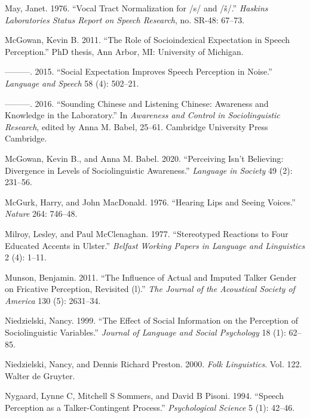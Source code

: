 \documentclass[
  letterpaper,
  DIV=11,
  numbers=noendperiod]{scrartcl}
\newlength{\cslhangindent}
\newenvironment{CSLReferences}[2] %
 {\begin{list}{}{%
  \setlength{\itemindent}{0pt}
  \setlength{\leftmargin}{0pt}
  \setlength{\parsep}{0pt}
  \ifodd #1
   \setlength{\leftmargin}{\cslhangindent}
   \setlength{\itemindent}{-1\cslhangindent}
  \fi
  \setlength{\itemsep}{#2\baselineskip}}}
 {\end{list}}
\begin{document}
\begin{CSLReferences}{1}{0}
May, Janet. 1976. {``Vocal Tract Normalization for /s/ and /š/.''}
\emph{Haskins Laboratories Status Report on Speech Research}, no. SR-48:
67--73.

McGowan, Kevin B. 2011. {``The Role of Socioindexical Expectation in
Speech Perception.''} PhD thesis, Ann Arbor, MI: University of Michigan.

---------. 2015. {``Social Expectation Improves Speech Perception in
Noise.''} \emph{Language and Speech} 58 (4): 502--21.

---------. 2016. {``Sounding Chinese and Listening Chinese: Awareness
and Knowledge in the Laboratory.''} In \emph{Awareness and Control in
Sociolinguistic Research}, edited by Anna M. Babel, 25--61. Cambridge
University Press Cambridge.

McGowan, Kevin B., and Anna M. Babel. 2020. {``Perceiving Isn't
Believing: Divergence in Levels of Sociolinguistic Awareness.''}
\emph{Language in Society} 49 (2): 231--56.

McGurk, Harry, and John MacDonald. 1976. {``Hearing Lips and Seeing
Voices.''} \emph{Nature} 264: 746--48.

Milroy, Lesley, and Paul McClenaghan. 1977. {``Stereotyped Reactions to
Four Educated Accents in Ulster.''} \emph{Belfast Working Papers in
Language and Linguistics} 2 (4): 1--11.

Munson, Benjamin. 2011. {``The Influence of Actual and Imputed Talker
Gender on Fricative Perception, Revisited (l).''} \emph{The Journal of
the Acoustical Society of America} 130 (5): 2631--34.

Niedzielski, Nancy. 1999. {``The Effect of Social Information on the
Perception of Sociolinguistic Variables.''} \emph{Journal of Language
and Social Psychology} 18 (1): 62--85.

Niedzielski, Nancy, and Dennis Richard Preston. 2000. \emph{Folk
Linguistics}. Vol. 122. Walter de Gruyter.

Nygaard, Lynne C, Mitchell S Sommers, and David B Pisoni. 1994.
{``Speech Perception as a Talker-Contingent Process.''}
\emph{Psychological Science} 5 (1): 42--46.


\end{CSLReferences}
\end{document}
